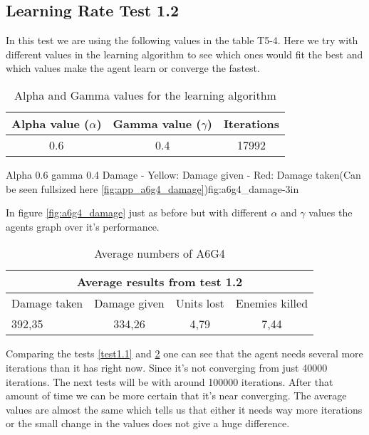 \subsection*{Learning Rate Test 1.2}
In this test we are using the following values in the table T5-4. Here we try with different values in the learning algorithm to see which ones would fit the best and which values make the agent learn or converge the fastest.


\begin{centering}
\begin{table}[H]
 \begin{tabular}{|c|c|c|}
	\hline
		Alpha value ($\alpha$) & Gamma value ($\gamma$) & Iterations\\
	\hline
		0.6 & 0.4 & 17992 \\
	\hline
\end{tabular}
\label{a6g4_table}
\caption{Alpha and Gamma values for the learning algorithm}
\end{table}
\end{centering}


			{Alpha 0.6 gamma 0.4 Damage - Yellow: Damage given - Red: Damage taken(Can be seen fullsized here \ref{fig:app_a6g4_damage})}{fig:a6g4_damage}{-3in}

In figure \ref{fig:a6g4_damage} just as before but with different $\alpha$ and $\gamma$ values the agents graph over it's performance.






\begin{centering}
\begin{table}
 \begin{tabular}{|l|c|c|c|}
	\multicolumn{4}{c}{Average results from test 1.2} \\
	\hline
		Damage taken & Damage given & Units lost & Enemies killed\\
	\hline
		392,35 & 334,26 & 4,79 & 7,44 \\
	\hline
\end{tabular}
\caption{Average numbers of A6G4}
\label{test1.2}
\end{table}
\end{centering}

Comparing the tests \ref{test1.1} and \ref{test1.2} one can see that the agent needs several more iterations than it has right now. Since it's not converging from just 40000 iterations. The next tests will be with around 100000 iterations. After that amount of time we can be more certain that it's near converging. The average values are almost the same which tells us that either it needs way more iterations or the small change in the values does not give a huge difference.